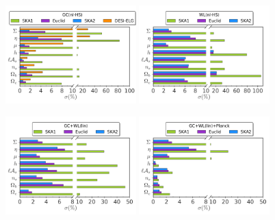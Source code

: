 \begin{figure}[htbp]
\begin{centering}
\includegraphics[width=0.45\textwidth]{Chapters/linear-nonlinear-MG-forecasts/figures/BarPlots/4surveys-GCnlHS-MGTR-earlytime}\hspace{-0.5pt}
\includegraphics[width=0.45\textwidth]{Chapters/linear-nonlinear-MG-forecasts/figures/BarPlots/4surveys-WLnlHS-MGTR-earlytime.pdf}

\includegraphics[width=0.45\textwidth]{Chapters/linear-nonlinear-MG-forecasts/figures/BarPlots/4surveys-GC+WLlin-MGTR-earlytime}\hspace{-0.5pt}
\includegraphics[width=0.45\textwidth]{Chapters/linear-nonlinear-MG-forecasts/figures/BarPlots/4surveys-GC+WLlin+Planck-MGTR-earlytime}


\end{centering}
\end{figure}
